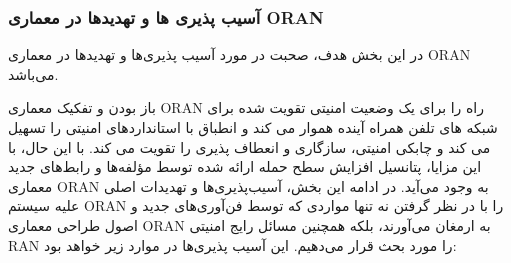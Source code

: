 \subsubsection{آسیب پذیری ها و تهدیدها در معماری ORAN}
در این بخش هدف، صحبت در مورد آسیب پذیری‌ها و تهدیدها در معماری ORAN می‌باشد.

باز بودن و تفکیک معماری ORAN راه را برای یک وضعیت امنیتی تقویت شده برای شبکه های تلفن همراه آینده هموار می کند و انطباق با استانداردهای امنیتی را تسهیل می کند و چابکی امنیتی، سازگاری و انعطاف پذیری را تقویت می کند. با این حال، با این مزایا، پتانسیل افزایش سطح حمله ارائه شده توسط مؤلفه‌ها و رابط‌های جدید معماری ORAN \cite{ORANSec} به وجود می‌آید. در ادامه این بخش، آسیب‌پذیری‌ها و تهدیدات اصلی علیه سیستم ORAN را با در نظر گرفتن نه تنها مواردی که توسط فن‌آوری‌های جدید و اصول طراحی معماری ORAN به ارمغان می‌آورند، بلکه همچنین مسائل رایج امنیتی  RAN را مورد بحث قرار می‌دهیم.
این آسیب پذیری‌ها در موارد زیر خواهد بود:
